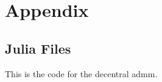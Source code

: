 \appendix				
\section{Appendix}

\subsection{Julia Files}
This is the code for the decentral \gls{admm}.

